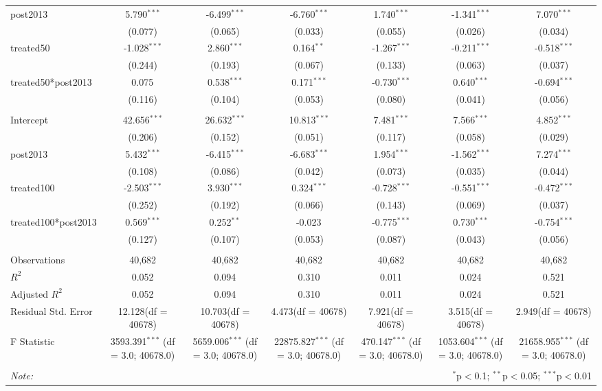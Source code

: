 \documentclass[12pt]{article}
\begin{document}
\begin{table}[!htbp]
\begin{tabular}{@{\extracolsep{5pt}}lcccccc}
 post2013 & 5.790$^{***}$ & -6.499$^{***}$ & -6.760$^{***}$ & 1.740$^{***}$ & -1.341$^{***}$ & 7.070$^{***}$ \\
  & (0.077) & (0.065) & (0.033) & (0.055) & (0.026) & (0.034) \\
 treated50 & -1.028$^{***}$ & 2.860$^{***}$ & 0.164$^{**}$ & -1.267$^{***}$ & -0.211$^{***}$ & -0.518$^{***}$ \\
  & (0.244) & (0.193) & (0.067) & (0.133) & (0.063) & (0.037) \\
 treated50*post2013 & 0.075$^{}$ & 0.538$^{***}$ & 0.171$^{***}$ & -0.730$^{***}$ & 0.640$^{***}$ & -0.694$^{***}$ \\
  & (0.116) & (0.104) & (0.053) & (0.080) & (0.041) & (0.056) \\
\hline \\[-1.8ex]
 Intercept & 42.656$^{***}$ & 26.632$^{***}$ & 10.813$^{***}$ & 7.481$^{***}$ & 7.566$^{***}$ & 4.852$^{***}$ \\
  & (0.206) & (0.152) & (0.051) & (0.117) & (0.058) & (0.029) \\
 post2013 & 5.432$^{***}$ & -6.415$^{***}$ & -6.683$^{***}$ & 1.954$^{***}$ & -1.562$^{***}$ & 7.274$^{***}$ \\
  & (0.108) & (0.086) & (0.042) & (0.073) & (0.035) & (0.044) \\
 treated100 & -2.503$^{***}$ & 3.930$^{***}$ & 0.324$^{***}$ & -0.728$^{***}$ & -0.551$^{***}$ & -0.472$^{***}$ \\
  & (0.252) & (0.192) & (0.066) & (0.143) & (0.069) & (0.037) \\
 treated100*post2013 & 0.569$^{***}$ & 0.252$^{**}$ & -0.023$^{}$ & -0.775$^{***}$ & 0.730$^{***}$ & -0.754$^{***}$ \\
  & (0.127) & (0.107) & (0.053) & (0.087) & (0.043) & (0.056) \\
\hline \\[-1.8ex]
 Observations & 40,682 & 40,682 & 40,682 & 40,682 & 40,682 & 40,682 \\
 $R^2$ & 0.052 & 0.094 & 0.310 & 0.011 & 0.024 & 0.521 \\
 Adjusted $R^2$ & 0.052 & 0.094 & 0.310 & 0.011 & 0.024 & 0.521 \\
 Residual Std. Error & 12.128(df = 40678) & 10.703(df = 40678) & 4.473(df = 40678) & 7.921(df = 40678) & 3.515(df = 40678) & 2.949(df = 40678)  \\
 F Statistic & 3593.391$^{***}$ (df = 3.0; 40678.0) & 5659.006$^{***}$ (df = 3.0; 40678.0) & 22875.827$^{***}$ (df = 3.0; 40678.0) & 470.147$^{***}$ (df = 3.0; 40678.0) & 1053.604$^{***}$ (df = 3.0; 40678.0) & 21658.955$^{***}$ (df = 3.0; 40678.0) \\
\hline
\hline \\[-1.8ex]
\textit{Note:} & \multicolumn{6}{r}{$^{*}$p$<$0.1; $^{**}$p$<$0.05; $^{***}$p$<$0.01} \\
\end{tabular}
\end{table}
\end{document}
